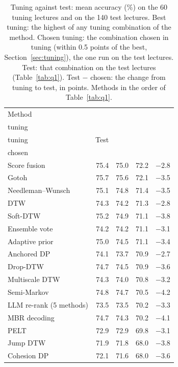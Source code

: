\begin{table}[t]
\centering
\setlength{\tabcolsep}{1em}
\caption{Tuning against test: mean accuracy (\%) on the 60 tuning lectures and on the 140 test lectures. Best tuning: the highest of any tuning combination of the method. Chosen tuning: the combination chosen in tuning (within 0.5 points of the best, Section~\ref{sec:tuning}), the one run on the test lectures. Test: that combination on the test lectures (Table~\ref{tab:q1}). Test $-$ chosen: the change from tuning to test, in points. Methods in the order of Table~\ref{tab:q1}.}
\label{tab:tuning}
\begin{tabular*}{\linewidth}{@{\extracolsep{\fill}}lrrrr@{}}
\toprule
Method & \begin{tabular}[b]{@{}r@{}}Best\\tuning\end{tabular} & \begin{tabular}[b]{@{}r@{}}Chosen\\tuning\end{tabular} & Test & \begin{tabular}[b]{@{}r@{}}Test $-$\\chosen\end{tabular} \\
\midrule
Score fusion & 75.4 & 75.0 & 72.2 & $-$2.8 \\
Gotoh & 75.7 & 75.6 & 72.1 & $-$3.5 \\
Needleman--Wunsch & 75.1 & 74.8 & 71.4 & $-$3.5 \\
DTW & 74.3 & 74.2 & 71.3 & $-$2.8 \\
Soft-DTW & 75.2 & 74.9 & 71.1 & $-$3.8 \\
Ensemble vote & 74.2 & 74.2 & 71.1 & $-$3.1 \\
Adaptive prior & 75.0 & 74.5 & 71.1 & $-$3.4 \\
Anchored DP & 74.1 & 73.7 & 70.9 & $-$2.7 \\
Drop-DTW & 74.7 & 74.5 & 70.9 & $-$3.6 \\
Multiscale DTW & 74.3 & 74.0 & 70.8 & $-$3.2 \\
Semi-Markov & 74.8 & 74.7 & 70.5 & $-$4.2 \\
LLM re-rank (5 methods) & 73.5 & 73.5 & 70.2 & $-$3.3 \\
MBR decoding & 74.7 & 74.3 & 70.2 & $-$4.1 \\
PELT & 72.9 & 72.9 & 69.8 & $-$3.1 \\
Jump DTW & 71.9 & 71.8 & 68.0 & $-$3.8 \\
Cohesion DP & 72.1 & 71.6 & 68.0 & $-$3.6 \\

\end{tabular*}
\end{table}
